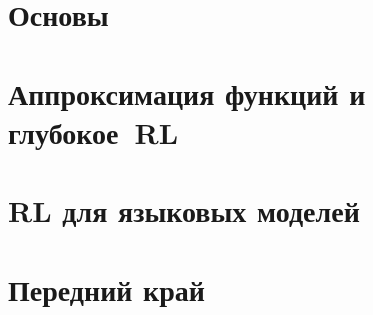 \documentclass[oneside,openany]{book}
\theoremstyle{definition}
\theoremstyle{plain}
\theoremstyle{remark}
\begin{document}
\mainmatter

\part{Основы}







\part{Аппроксимация функций и глубокое~RL}




\part{RL для языковых моделей}






\part{Передний край}




\appendix


\backmatter



\printindex
\end{document}
